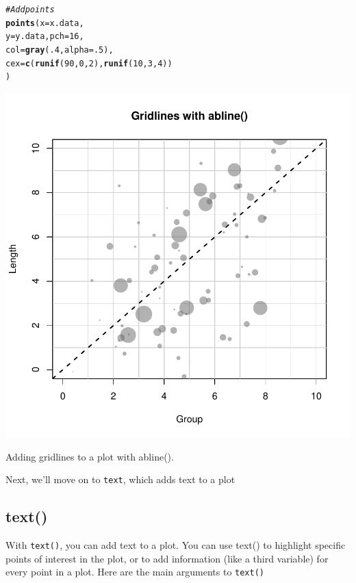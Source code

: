 \documentclass{tufte-book}\usepackage[]{graphicx}\usepackage[]{color}
\makeatletter
\def\maxwidth{ %
  \ifdim\Gin@nat@width>\linewidth
    \linewidth
  \else
    \Gin@nat@width
  \fi
}
\newcommand{\hlnum}[1]{\textcolor[rgb]{0.686,0.059,0.569}{#1}}%
\newcommand{\hlcom}[1]{\textcolor[rgb]{0.678,0.584,0.686}{\textit{#1}}}%
\newcommand{\hlstd}[1]{\textcolor[rgb]{0.345,0.345,0.345}{#1}}%
\newcommand{\hlkwc}[1]{\textcolor[rgb]{0.333,0.667,0.333}{#1}}%
\newcommand{\hlkwd}[1]{\textcolor[rgb]{0.737,0.353,0.396}{\textbf{#1}}}%
\newenvironment{kframe}{%
 \def\at@end@of@kframe{}%
 \ifinner\ifhmode%
  \def\at@end@of@kframe{\end{minipage}}%
  \begin{minipage}{\columnwidth}%
 \fi\fi%
 \def\FrameCommand##1{\hskip\@totalleftmargin \hskip-\fboxsep
 \colorbox{shadecolor}{##1}\hskip-\fboxsep
     \hskip-\linewidth \hskip-\@totalleftmargin \hskip\columnwidth}%
 \MakeFramed {\advance\hsize-\width
   \@totalleftmargin\z@ \linewidth\hsize
   \@setminipage}}%
 {\par\unskip\endMakeFramed%
 \at@end@of@kframe}
\newenvironment{knitrout}{}{} %
\makeatother
\begin{document}
\begin{marginfigure}
\begin{tiny}
\begin{knitrout}
\begin{kframe}
\begin{alltt}
\hlcom{# Add points}
\hlkwd{points}\hlstd{(}\hlkwc{x} \hlstd{= x.data,}
       \hlkwc{y} \hlstd{= y.data,} \hlkwc{pch} \hlstd{=} \hlnum{16}\hlstd{,}
       \hlkwc{col} \hlstd{=} \hlkwd{gray}\hlstd{(}\hlnum{.4}\hlstd{,} \hlkwc{alpha} \hlstd{=} \hlnum{.5}\hlstd{),}
       \hlkwc{cex} \hlstd{=} \hlkwd{c}\hlstd{(}\hlkwd{runif}\hlstd{(}\hlnum{90}\hlstd{,} \hlnum{0}\hlstd{,} \hlnum{2}\hlstd{),} \hlkwd{runif}\hlstd{(}\hlnum{10}\hlstd{,} \hlnum{3}\hlstd{,} \hlnum{4}\hlstd{))}
       \hlstd{)}
\end{alltt}
\end{kframe}
\includegraphics[width=\maxwidth]{figure/unnamed-chunk-210-1} 

\end{knitrout}
\caption{Adding gridlines to a plot with abline().}
\label{fig:gridlinesexample}
\end{tiny}
\end{marginfigure}

Next, we'll move on to \texttt{text}, which adds text to a plot

\subsection{text()}

With \texttt{text()}, you can add text to a plot. You can use text() to highlight specific points of interest in the plot, or to add information (like a third variable) for every point in a plot. Here are the main arguments to \texttt{text()}
\end{document}
